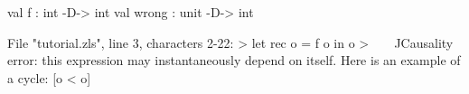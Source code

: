 \chklistingfalse
{}
\begin{ChkListingMsg}
val f : int -D-> int 
val wrong : unit -D-> int 
\end{ChkListingMsg}
\begin{ChkListingErr}
File "tutorial.zls", line 3, characters 2-22:
>  let rec o = f o in o
>  ^^^^^^^^^^^^^^^^^^^^
Causality error: this expression may instantaneously depend on itself.
Here is an example of a cycle:
[o < o]
\end{ChkListingErr}
